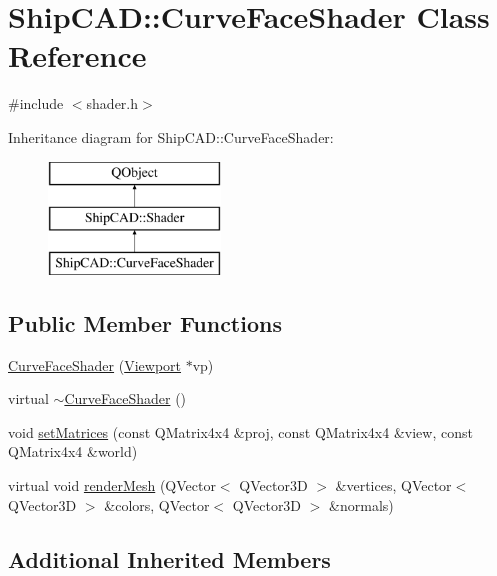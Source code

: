 \hypertarget{classShipCAD_1_1CurveFaceShader}{}\section{Ship\+C\+AD\+:\+:Curve\+Face\+Shader Class Reference}
\label{classShipCAD_1_1CurveFaceShader}


{\ttfamily \#include $<$shader.\+h$>$}

Inheritance diagram for Ship\+C\+AD\+:\+:Curve\+Face\+Shader\+:\begin{figure}[H]
\begin{center}
\leavevmode
\includegraphics[height=3.000000cm]{classShipCAD_1_1CurveFaceShader}
\end{center}
\end{figure}
\subsection*{Public Member Functions}
\begin{DoxyCompactItemize}
\item 
\hyperlink{classShipCAD_1_1CurveFaceShader_acad5b622793dabf42d6be2a84bdc38dd}{Curve\+Face\+Shader} (\hyperlink{classShipCAD_1_1Viewport}{Viewport} $\ast$vp)
\item 
virtual \hyperlink{classShipCAD_1_1CurveFaceShader_af99773914de0758627d57aae99b5d44b}{$\sim$\+Curve\+Face\+Shader} ()
\item 
void \hyperlink{classShipCAD_1_1CurveFaceShader_aff6cca39c6e9c17c7dee2040724c5946}{set\+Matrices} (const Q\+Matrix4x4 \&proj, const Q\+Matrix4x4 \&view, const Q\+Matrix4x4 \&world)
\item 
virtual void \hyperlink{classShipCAD_1_1CurveFaceShader_ab817219da96b3dc744b19ee93f466a1f}{render\+Mesh} (Q\+Vector$<$ Q\+Vector3D $>$ \&vertices, Q\+Vector$<$ Q\+Vector3D $>$ \&colors, Q\+Vector$<$ Q\+Vector3D $>$ \&normals)
\end{DoxyCompactItemize}
\subsection*{Additional Inherited Members}


